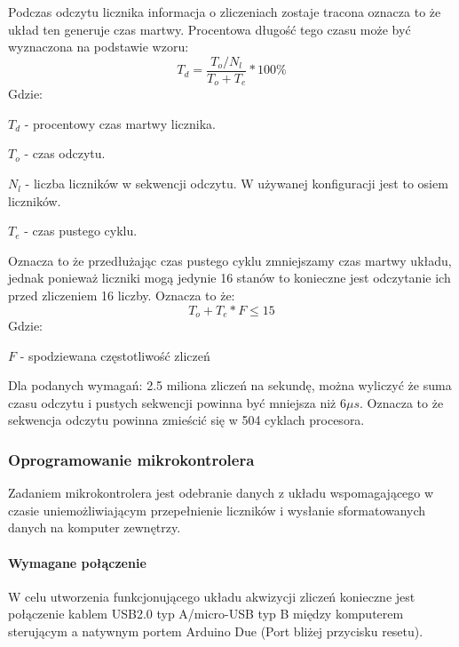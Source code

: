 Podczas odczytu licznika informacja o zliczeniach zostaje tracona oznacza to że układ ten generuje czas martwy. 
Procentowa długość tego czasu może być wyznaczona na podstawie wzoru:
\begin{equation}
        T_d = \frac{T_o/N_l}{T_o+T_e} * 100\%
\end{equation}
Gdzie:
\begin{description}
        \item $T_d$ - procentowy czas martwy licznika.
        \item $T_o$ - czas odczytu.
        \item $N_l$ - liczba liczników w sekwencji odczytu. W używanej konfiguracji jest to osiem liczników. 
        \item $T_e$ - czas pustego cyklu.
\end{description}

Oznacza to że przedłużając czas pustego cyklu zmniejszamy czas martwy układu, jednak ponieważ liczniki mogą jedynie 16 stanów to konieczne jest odczytanie ich przed zliczeniem 16 liczby. 
Oznacza to że:
\begin{equation}
        T_o+T_e * F \leqslant 15
\end{equation}
        Gdzie:
\begin{description}
        \item $F$ - spodziewana częstotliwość zliczeń
\end{description}

Dla podanych wymagań: 2.5 miliona zliczeń na sekundę, można wyliczyć że suma czasu odczytu i pustych sekwencji powinna być mniejsza niż 6$\mu s$.
Oznacza to że sekwencja odczytu powinna zmieścić się w 504 cyklach procesora. 

\subsubsection{Oprogramowanie mikrokontrolera}

Zadaniem mikrokontrolera jest odebranie danych z układu wspomagającego w czasie uniemożliwiającym przepełnienie liczników i wysłanie sformatowanych danych na komputer zewnętrzy. 

\paragraph{Wymagane połączenie}
W celu utworzenia funkcjonującego układu akwizycji zliczeń konieczne jest połączenie kablem USB2.0 typ A/micro-USB typ B między komputerem sterującym a natywnym portem Arduino Due (Port bliżej przycisku resetu).


